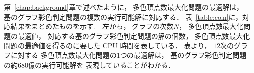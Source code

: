 第~\ref{chap:background}章で述べたように，
多色頂点数最大化問題の最適解は，
基のグラフ彩色判定問題の複数の実行可能解に対応する．
表~\ref{table:com}に，対応結果をまとめたものを示す．
左から，
グラフの次数$N$，
多色頂点数最大化問題の最適値，
対応する基のグラフ彩色判定問題の解の個数，
多色頂点数最大化問題の最適値を得るのに要した CPU 時間を表している．
表より，
$12$次のグラフに対する
多色頂点数最大化問題の1つの最適解は，
基のグラフ彩色判定問題の約680億の実行可能解を
表現していることがわかる．


